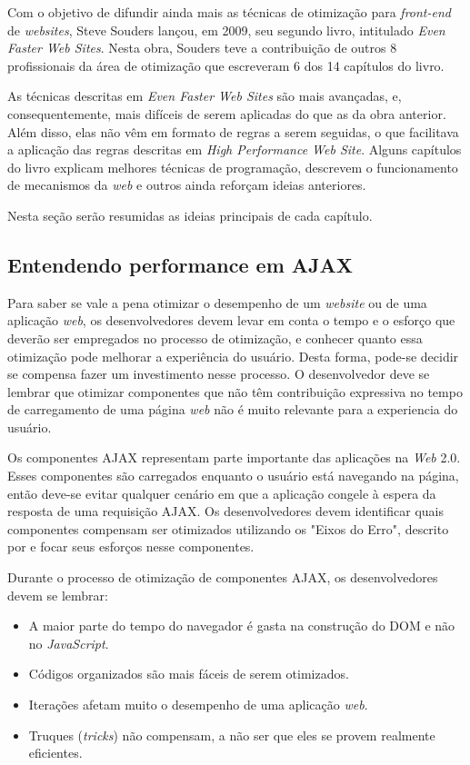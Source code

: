 Com o objetivo de difundir ainda mais as técnicas de otimização para \textit{front-end} de \textit{websites}, Steve Souders lançou, em 2009, seu segundo livro, intitulado \textit{Even Faster Web Sites}. Nesta obra, Souders teve a contribuição de outros 8 profissionais da área de otimização que escreveram 6 dos 14 capítulos do livro.

As técnicas descritas em \textit{Even Faster Web Sites} são mais avançadas, e, consequentemente, mais difíceis de serem aplicadas do que as da obra anterior. Além disso, elas não vêm em formato de regras a serem seguidas, o que facilitava a aplicação das regras descritas em \textit{High Performance Web Site}. Alguns capítulos do livro explicam melhores técnicas de programação, descrevem o funcionamento de mecanismos da \textit{web} e outros ainda reforçam ideias anteriores.

Nesta seção serão resumidas as ideias principais de cada capítulo.

\subsection{Entendendo performance em AJAX}
\label{subsec:evenfaster_cap1}
Para saber se vale a pena otimizar o desempenho de um \textit{website} ou de uma aplicação \textit{web}, os desenvolvedores devem levar em conta o tempo e o esforço que deverão ser empregados no processo de otimização, e conhecer quanto essa otimização pode melhorar a experiência do usuário. Desta forma, pode-se decidir se compensa fazer um investimento nesse processo. O desenvolvedor deve se lembrar que otimizar componentes que não têm contribuição expressiva no tempo de carregamento de uma página \textit{web} não é muito relevante para a experiencia do usuário.

Os componentes AJAX representam parte importante das aplicações na \textit{Web} 2.0. Esses componentes são carregados enquanto o usuário está navegando na página, então deve-se evitar qualquer cenário em que a aplicação congele à espera da resposta de uma requisição AJAX. Os desenvolvedores devem identificar quais componentes compensam ser otimizados utilizando os "Eixos do Erro", descrito por  e focar seus esforços nesse componentes.

Durante o processo de otimização de componentes AJAX, os desenvolvedores devem se lembrar:
\begin{itemize}
	\item A maior parte do tempo do navegador é gasta na construção do DOM e não no \textit{JavaScript}.
	\item Códigos organizados são mais fáceis de serem otimizados.
	\item Iterações afetam muito o desempenho de uma aplicação \textit{web}.
	\item Truques (\textit{tricks}) não compensam, a não ser que eles se provem realmente eficientes.
\end{itemize}

